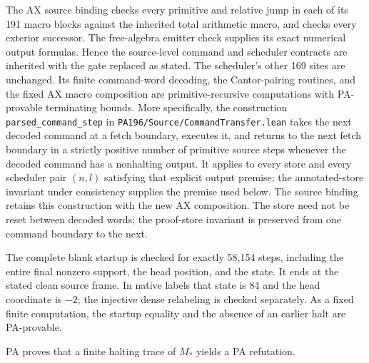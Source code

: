 The AX source binding checks every primitive and relative jump in
each of its 191 macro blocks against the inherited total arithmetic
macro, and checks every exterior successor. The free-algebra emitter
check supplies its exact numerical output formulas. Hence the
source-level command and scheduler contracts are inherited with
the gate replaced as stated. The scheduler's other 169 sites are
unchanged. Its finite command-word decoding, the Cantor-pairing
routines, and the fixed AX macro composition are primitive-recursive
computations with PA-provable terminating bounds. More specifically,
the construction \texttt{parsed\_command\_step} in
\texttt{PA196/Source/CommandTransfer.lean} takes the next decoded
command at a fetch boundary, executes it, and returns to the next
fetch boundary in a strictly positive number of primitive source
steps whenever the decoded command has a nonhalting output. It applies
to every store and every scheduler pair $(n,l)$ satisfying that explicit
output premise; the annotated-store invariant under consistency
supplies the premise used below.
The source binding retains this construction with the new AX
composition. The store need not be reset between decoded words;
the proof-store invariant is preserved from one command boundary
to the next.

The complete blank startup is checked for exactly 58,154 steps,
including the entire final nonzero support, the head position,
and the state. It ends at the stated clean source frame.
In native labels that state is 84 and the head coordinate is $-2$;
the injective dense relabeling is checked separately. As a fixed
finite computation, the startup equality and the absence of an
earlier halt are PA-provable.

\begin{lemma}
\label{lem:pa-positive-reflection}
PA proves that a finite halting trace of $M_*$ yields a PA
refutation.
\end{lemma}

